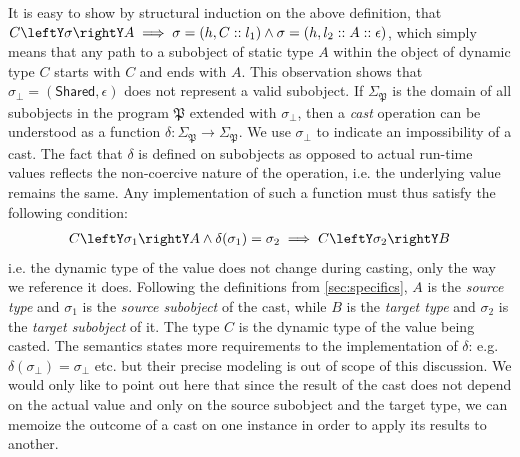 It is easy to show by structural induction on the above definition, that 
$C\leftY\sigma\rightY A \implies \sigma=(h,C::l_1) \wedge \sigma=(h,l_2::A::\epsilon)$, 
which simply means that any path to a subobject of static type $A$ within the 
object of dynamic type $C$ starts with $C$ and ends with $A$. This 
observation shows that $\sigma_\bot = (\mathsf{Shared},\epsilon)$ does not 
represent a valid subobject. If $\Sigma_\mathfrak{P}$ is the domain of all subobjects in 
the program $\mathfrak{P}$ extended with $\sigma_\bot$, then a \emph{cast} operation can be 
understood as a function $\delta : \Sigma_\mathfrak{P} \rightarrow \Sigma_\mathfrak{P}$. We use 
$\sigma_\bot$ to indicate an impossibility of a cast. The fact that $\delta$ is 
defined on subobjects as opposed to actual run-time values reflects the 
non-coercive nature of the operation, i.e. the underlying value remains the 
same. Any implementation of such a function must thus satisfy the following 
condition:
\begin{eqnarray*}
C \leftY\sigma_1\rightY A \wedge \delta(\sigma_1) = \sigma_2 \implies C \leftY\sigma_2\rightY B
\end{eqnarray*}
\noindent
i.e. the dynamic type of the value does not change during casting, only the way 
we reference it does. Following the definitions from 
\textsection\ref{sec:specifics}, $A$ is the \emph{source type} and $\sigma_1$ is 
the \emph{source subobject} of the cast, while $B$ is the \emph{target type} and 
$\sigma_2$ is the \emph{target subobject} of it. The type $C$ is the 
dynamic type of the value being casted. The \Cpp{} semantics states more 
requirements to the implementation of $\delta$: e.g. 
$\delta(\sigma_\bot) = \sigma_\bot$ etc. but their precise modeling is out of 
scope of this discussion. We would only like to point out here that since 
the result of the cast does not depend on the actual value and only on the 
source subobject and the target type, we can memoize the outcome of a cast on 
one instance in order to apply its results to another.

